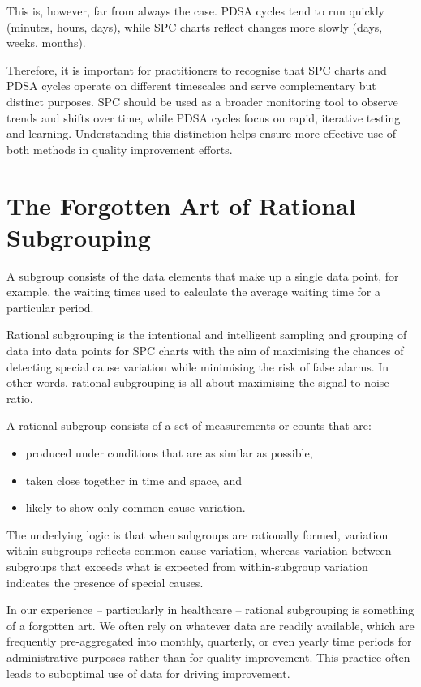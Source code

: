 \documentclass[
]{book}
\providecommand{\tightlist}{%
  \setlength{\itemsep}{0pt}\setlength{\parskip}{0pt}}
\begin{document}
This is, however, far from always the case. PDSA cycles tend to run quickly (minutes, hours, days), while SPC charts reflect changes more slowly (days, weeks, months).

Therefore, it is important for practitioners to recognise that SPC charts and PDSA cycles operate on different timescales and serve complementary but distinct purposes. SPC should be used as a broader monitoring tool to observe trends and shifts over time, while PDSA cycles focus on rapid, iterative testing and learning. Understanding this distinction helps ensure more effective use of both methods in quality improvement efforts.

\chapter{The Forgotten Art of Rational Subgrouping}\label{subgrouping}

A subgroup consists of the data elements that make up a single data point, for example, the waiting times used to calculate the average waiting time for a particular period.

Rational subgrouping is the intentional and intelligent sampling and grouping of data into data points for SPC charts with the aim of maximising the chances of detecting special cause variation while minimising the risk of false alarms. In other words, rational subgrouping is all about maximising the signal-to-noise ratio.

A rational subgroup consists of a set of measurements or counts that are:

\begin{itemize}
\tightlist
\item
  produced under conditions that are as similar as possible,
\item
  taken close together in time and space, and
\item
  likely to show only common cause variation.
\end{itemize}

The underlying logic is that when subgroups are rationally formed, variation within subgroups reflects common cause variation, whereas variation between subgroups that exceeds what is expected from within-subgroup variation indicates the presence of special causes.

In our experience -- particularly in healthcare -- rational subgrouping is something of a forgotten art. We often rely on whatever data are readily available, which are frequently pre-aggregated into monthly, quarterly, or even yearly time periods for administrative purposes rather than for quality improvement. This practice often leads to suboptimal use of data for driving improvement.
\end{document}
